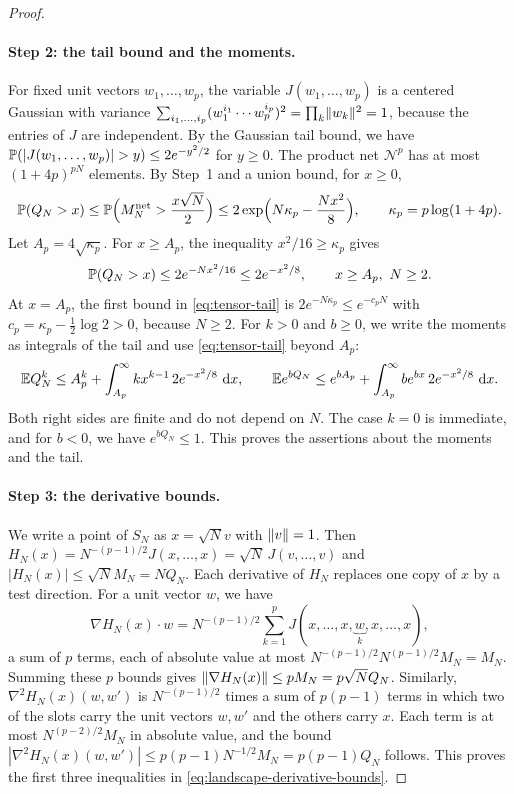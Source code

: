 \begin{proof}
\paragraph{Step 2: the tail bound and the moments.}
For fixed unit vectors $w_1,\dots,w_p$, the variable $J(w_1,\dots,w_p)$ is a centered Gaussian with variance $\sum_{i_1,\ldots,i_p}(w_1^{i_1}\cdots w_p^{i_p})^2=\prod_k\lVert w_k\rVert^2=1$, because the entries of $J$ are independent. By the Gaussian tail bound, we have $\Prob(|J(w_1,\dots,w_p)|>y)\le2e^{-y^2/2}$ for $y\ge0$. The product net $\mathcal N^p$ has at most $(1+4p)^{pN}$ elements. By Step~1 and a union bound, for $x\ge0$,
\[
 \mathbb P(Q_N>x)\le\mathbb P\Bigl(M_N^{\mathrm{net}}>\frac{x\sqrt N}2\Bigr)
 \le2\exp\Bigl(N\kappa_p-\frac{Nx^2}8\Bigr),\qquad \kappa_p=p\log(1+4p).
\]
Let $A_p=4\sqrt{\kappa_p}$. For $x\ge A_p$, the inequality $x^2/16\ge\kappa_p$ gives
\begin{equation}\label{eq:tensor-tail}
 \Prob(Q_N>x)\le2e^{-Nx^2/16}\le2e^{-x^2/8},\qquad x\ge A_p,\ N\ge2.
\end{equation}
At $x=A_p$, the first bound in \eqref{eq:tensor-tail} is $2e^{-N\kappa_p}\le e^{-c_pN}$ with $c_p=\kappa_p-\frac12\log2>0$, because $N\ge2$. For $k>0$ and $b\ge0$, we write the moments as integrals of the tail and use \eqref{eq:tensor-tail} beyond $A_p$:
\[
 \mathbb E Q_N^k\le A_p^k+\int_{A_p}^\infty kx^{k-1}\,2e^{-x^2/8}\,\mathop{}\!\mathrm d x,\qquad
 \mathbb E e^{bQ_N}\le e^{bA_p}+\int_{A_p}^\infty be^{bx}\,2e^{-x^2/8}\,\mathop{}\!\mathrm d x.
\]
Both right sides are finite and do not depend on $N$. The case $k=0$ is immediate, and for $b<0$, we have $e^{bQ_N}\le1$. This proves the assertions about the moments and the tail.

\paragraph{Step 3: the derivative bounds.}
We write a point of $S_N$ as $x=\sqrt Nv$ with $\lVert v\rVert=1$. Then $H_N(x)=N^{-(p-1)/2}J(x,\dots,x)=\sqrt N\,J(v,\dots,v)$ and $|H_N(x)|\le\sqrt NM_N=NQ_N$. Each derivative of $H_N$ replaces one copy of $x$ by a test direction. For a unit vector $w$, we have
\[
 \nabla H_N(x)\cdot w=N^{-(p-1)/2}\sum_{k=1}^pJ(x,\dots,x,\underbrace{w}_{k},x,\dots,x),
\]
a sum of $p$ terms, each of absolute value at most $N^{-(p-1)/2}N^{(p-1)/2}M_N=M_N$. Summing these $p$ bounds gives $\lVert\nabla H_N(x)\rVert\le pM_N=p\sqrt NQ_N$. Similarly, $\nabla^2H_N(x)(w,w')$ is $N^{-(p-1)/2}$ times a sum of $p(p-1)$ terms in which two of the slots carry the unit vectors $w,w'$ and the others carry $x$. Each term is at most $N^{(p-2)/2}M_N$ in absolute value, and the bound $|\nabla^2H_N(x)(w,w')|\le p(p-1)N^{-1/2}M_N=p(p-1)Q_N$ follows. This proves the first three inequalities in \eqref{eq:landscape-derivative-bounds}.


\end{proof}
